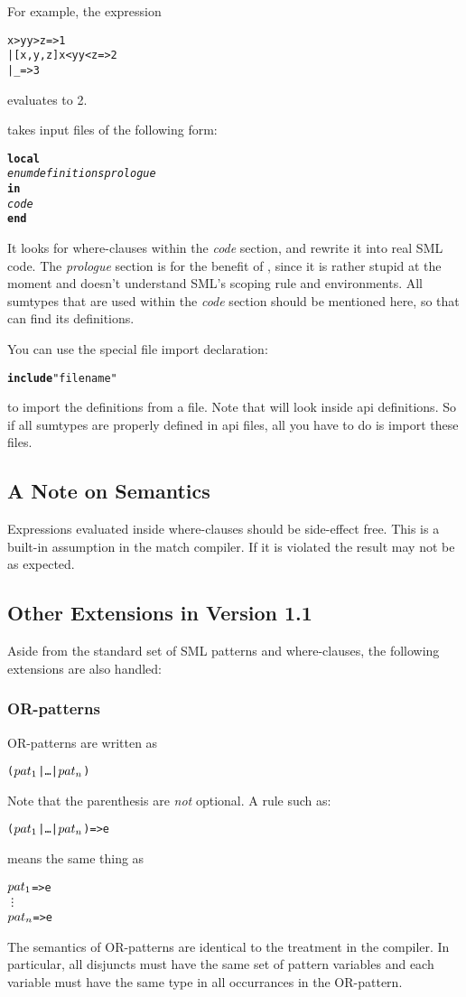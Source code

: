 For example, the expression
\begin{alltt}
   \CASE [1,2,3] \OF 
      [x,y,z] \WHERE x>y \AND y>z => 1
    | [x,y,z] \WHERE x<y \AND y<z => 2
    | _ => 3
\end{alltt}
evaluates to 2.

\Nowhere{} takes input files of the following form:
\begin{alltt}
{\bf local}
    {\sl enum definitions prologue}
{\bf in}
    {\sl code}
{\bf end}
\end{alltt}
It looks for where-clauses within the {\sl code} section, and rewrite it into
real SML code.  The {\sl prologue} section is for the benefit
of \nowhere, since it is rather stupid at the moment and doesn't understand
SML's scoping rule and environments.  
All sumtypes that are used within the {\sl code}
section should be mentioned here, so that \nowhere{} can find its definitions.

You can use the special file import declaration:
\begin{alltt}
  {\bf include} "filename"
\end{alltt}
to import the definitions from a file.  Note that \nowhere{} will look 
inside api definitions.  So if all sumtypes are
properly defined in api files, all you have to do is import these
files.

\subsection{A Note on Semantics}
   Expressions evaluated inside where-clauses should be side-effect free.
This is a built-in assumption in the match compiler.  If it is violated
the result may not be as expected. 

\subsection{Other Extensions in Version 1.1}

  Aside from the standard set of SML patterns and where-clauses, 
the following extensions are also handled:
\subsubsection{OR-patterns}   OR-patterns are written as
\begin{alltt}
   (\(pat\sb{1}\) | \ldots | \(pat\sb{n}\))
\end{alltt}
Note that the parenthesis are {\em not} optional.  A rule such as:
\begin{alltt}
   (\(pat\sb{1}\) | \ldots | \(pat\sb{n}\)) => e
\end{alltt}
means the same thing as
\begin{alltt}
   \(pat\sb{1}\) => e
     \vdots
   \(pat\sb{n}\) => e
\end{alltt}
The semantics of OR-patterns are identical to the treatment in the compiler.
In particular, all disjuncts must have the same set of pattern variables
and each variable must have the same type in all occurrances in the OR-pattern. 

